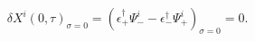\begin{equation}
\delta X^{i}(0,\tau)_{\sigma = 0} =
(\epsilon_{+}^{\dag}\Psi_{-}^{i}-\epsilon_{-}^{\dag}
\Psi_{+}^{i})_{\sigma=0}=0.
\end{equation}

